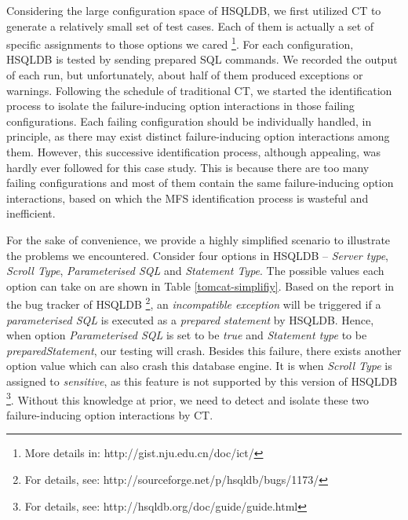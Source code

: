 \documentclass[journal,12pt,onecolumn,draftclsnofoot,]{IEEEtran}
\begin{document}
Considering the large configuration space of HSQLDB, we first utilized CT to generate a relatively small set of test cases. Each of them is actually a set of specific assignments to those options we cared  \footnote{More details in: http://gist.nju.edu.cn/doc/ict/}. For each configuration, HSQLDB is tested by sending prepared SQL commands. We recorded the output of each run, but unfortunately, about half of them produced exceptions or warnings. Following the schedule of traditional CT, we started the identification process to isolate the failure-inducing option interactions in those failing configurations. Each failing configuration should be individually handled, in principle, as there may exist distinct failure-inducing option interactions among them. However, this successive identification process, although appealing, was hardly ever followed for this case study. This is because there are too many failing configurations and most of them contain the same failure-inducing option interactions, based on which the MFS identification process is wasteful and inefficient.

For the sake of convenience, we provide a highly simplified scenario to illustrate the problems we encountered. Consider four options in HSQLDB -- \emph{Server type}, \emph{Scroll Type}, \emph{Parameterised SQL} and \emph{Statement Type}.  The possible values each option can take on are shown in Table \ref{tomcat-simplifiy}. Based on the report in the bug tracker of HSQLDB \footnote{For details, see: http://sourceforge.net/p/hsqldb/bugs/1173/}, an \emph{incompatible exception} will be triggered if a \emph{parameterised SQL} is executed as a \emph{prepared statement} by HSQLDB. Hence, when option \emph{Parameterised SQL} is set to be \emph{true} and \emph{Statement type} to be \emph{preparedStatement}, our testing will crash. Besides this failure, there exists another option value which can also crash this database engine. It is when \emph{Scroll Type} is assigned to \emph{sensitive}, as this feature is not supported by this version of HSQLDB \footnote{For details, see: http://hsqldb.org/doc/guide/guide.html}. Without this knowledge at prior, we need to detect and isolate these two failure-inducing option interactions by CT.

%
\end{document}
